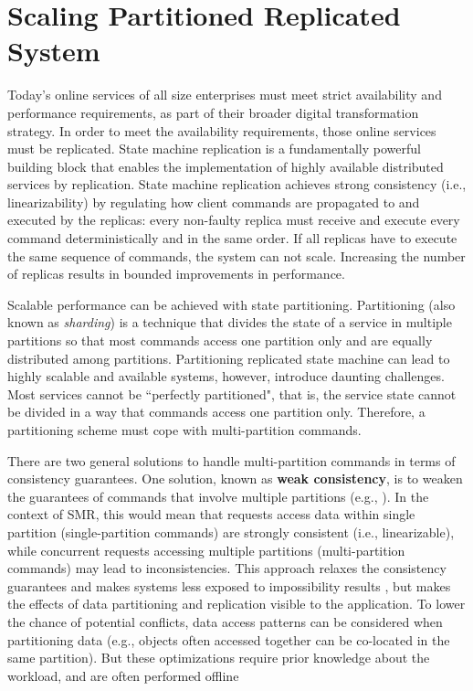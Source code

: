 \chapter[Scaling Partitioned Replicated System]{Scaling Partitioned Replicated System}

Today's online services of all size enterprises must meet strict availability
and performance requirements, as part of their broader digital transformation
strategy. In order to meet the availability requirements, those online services
must be replicated. State machine replication is a fundamentally powerful
building block that enables the implementation of highly available distributed
services by replication. State machine replication achieves strong consistency
(i.e., linearizability) by regulating how client commands are propagated to and
executed by the replicas: every non-faulty replica must receive and execute
every command deterministically and in the same order. If all replicas have to
execute the same sequence of commands, the system can not scale. Increasing the
number of replicas results in bounded improvements in performance.

Scalable performance can be achieved with state partitioning. Partitioning (also
known as \emph{sharding}) is a technique that divides the state of a service in
multiple partitions so that most commands access one partition only and are
equally distributed among partitions. Partitioning replicated state machine can
lead to highly scalable and available systems, however, introduce daunting
challenges. Most services cannot be ``perfectly partitioned", that is, the
service state cannot be divided in a way that commands access one partition
only. Therefore, a partitioning scheme must cope with multi-partition commands.

There are two general solutions to handle multi-partition commands in terms of
consistency guarantees. One solution, known as \textbf{weak consistency}, is to
weaken the guarantees of commands that involve multiple partitions (e.g.,
\cite{facebookTAO}). In the context of SMR, this would mean that requests access
data within single partition (single-partition commands) are strongly consistent
(i.e., linearizable), while concurrent requests accessing multiple partitions
(multi-partition commands) may lead to inconsistencies. This approach relaxes
the consistency guarantees and makes systems less exposed to impossibility
results \cite{FLP85, diskpaxos}, but makes the effects of data partitioning and
replication visible to the application. To lower the chance of potential
conflicts, data access patterns can be considered when partitioning data (e.g.,
objects often accessed together can be co-located in the same partition). But
these optimizations require prior knowledge about the workload, and are often
performed offline \cite{facebookTAO}

